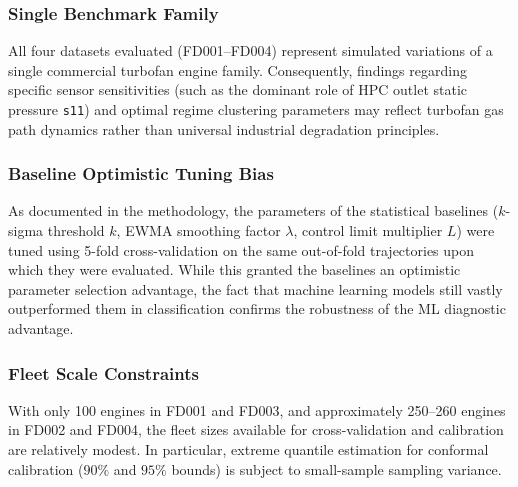 \subsubsection{Single Benchmark Family}
All four datasets evaluated (FD001--FD004) represent simulated variations of a single commercial turbofan engine family. Consequently, findings regarding specific sensor sensitivities (such as the dominant role of HPC outlet static pressure \texttt{s11}) and optimal regime clustering parameters may reflect turbofan gas path dynamics rather than universal industrial degradation principles.

\subsubsection{Baseline Optimistic Tuning Bias}
As documented in the methodology, the parameters of the statistical baselines ($k$-sigma threshold $k$, EWMA smoothing factor $\lambda$, control limit multiplier $L$) were tuned using 5-fold cross-validation on the same out-of-fold trajectories upon which they were evaluated. While this granted the baselines an optimistic parameter selection advantage, the fact that machine learning models still vastly outperformed them in classification confirms the robustness of the ML diagnostic advantage.

\subsubsection{Fleet Scale Constraints}
With only 100 engines in FD001 and FD003, and approximately 250--260 engines in FD002 and FD004, the fleet sizes available for cross-validation and calibration are relatively modest. In particular, extreme quantile estimation for conformal calibration ($90\%$ and $95\%$ bounds) is subject to small-sample sampling variance.

